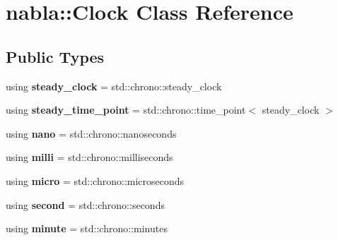 \hypertarget{classnabla_1_1_clock}{}\section{nabla\+::Clock Class Reference}
\label{classnabla_1_1_clock}
\subsection*{Public Types}
\begin{DoxyCompactItemize}
\item 
\mbox{\label{classnabla_1_1_clock_ae43f913bf7ee1cc869640d169c4ece47}} 
using {\bfseries steady\+\_\+clock} = std\+::chrono\+::steady\+\_\+clock
\item 
\mbox{\label{classnabla_1_1_clock_ac21b6d1d935e834e81d31b21e488a1b2}} 
using {\bfseries steady\+\_\+time\+\_\+point} = std\+::chrono\+::time\+\_\+point$<$ steady\+\_\+clock $>$
\item 
\mbox{\label{classnabla_1_1_clock_ae73be4664024f94fe74c4a2658f55fbc}} 
using {\bfseries nano} = std\+::chrono\+::nanoseconds
\item 
\mbox{\label{classnabla_1_1_clock_a8ceaaa9844e2f1f167ed534faba6bdf4}} 
using {\bfseries milli} = std\+::chrono\+::milliseconds
\item 
\mbox{\label{classnabla_1_1_clock_a4b1c7a8b316b21c12c7736ccc565c2f4}} 
using {\bfseries micro} = std\+::chrono\+::microseconds
\item 
\mbox{\label{classnabla_1_1_clock_ace27d6d519079b9406397855048a08bb}} 
using {\bfseries second} = std\+::chrono\+::seconds
\item 
\mbox{\label{classnabla_1_1_clock_a050ea7696379640c70cacc5411a69ecd}} 
using {\bfseries minute} = std\+::chrono\+::minutes
\end{DoxyCompactItemize}
